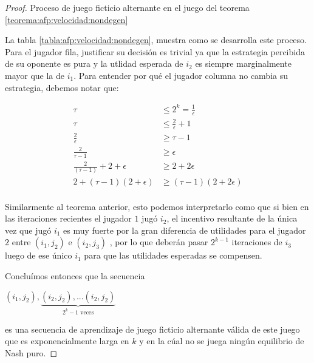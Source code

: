 \begin{proof}
    \begin{table}
        
        \caption{Proceso de juego ficticio alternante en el juego del teorema \ref{teorema:afp:velocidad:nondegen}}
        \label{tabla:afp:velocidad:nondegen}
    \end{table}

    La tabla \ref{tabla:afp:velocidad:nondegen}, muestra como se desarrolla este proceso. Para el jugador fila, justificar su decisión es trivial ya que la estrategia percibida de su oponente es pura y la utlidad esperada de  $i_2$ es siempre marginalmente mayor que la de $i_1$. Para entender por qué el jugador columna no cambia su estrategia, debemos notar que:

    \begin{align*}
        \tau &\le 2^k = \frac{1}{\epsilon} \\
        \tau &\le \frac{2}{\epsilon} + 1 \\
        \frac{2}{\epsilon} &\ge \tau - 1 \\
        \frac{2}{\tau - 1} &\ge \epsilon \\
        \frac{2}{(\tau - 1)} + 2 + \epsilon &\ge 2 + 2 \epsilon \\
        2 + (\tau - 1) (2 + \epsilon) &\ge (\tau - 1) (2 + 2 \epsilon) \\
    \end{align*}

    Similarmente al teorema anterior, esto podemos interpretarlo como que si bien en las iteraciones recientes el jugador $1$ jugó $i_2$, el incentivo resultante de la única vez que jugó $i_1$ es muy fuerte por la gran diferencia de utilidades para el jugador $2$ entre $(i_1, j_2)$ e $(i_2, j_3)$ , por lo que deberán pasar $2^{k-1}$ iteraciones de $i_3$ luego de ese único $i_1$ para que las utilidades esperadas se compensen.

    Concluímos entonces que la secuencia

    \begin{center}
    \begin{math}
        (i_1, j_2), \underbrace{(i_2, j_2), ... (i_2, j_2)}_{\text{$2^k - 1$ veces}}
    \end{math}
    \end{center}

    es una secuencia de aprendizaje de juego ficticio alternante válida de este juego que es exponencialmente larga en $k$ y en la cúal no se juega ningún equilibrio de Nash puro.
\end{proof}

